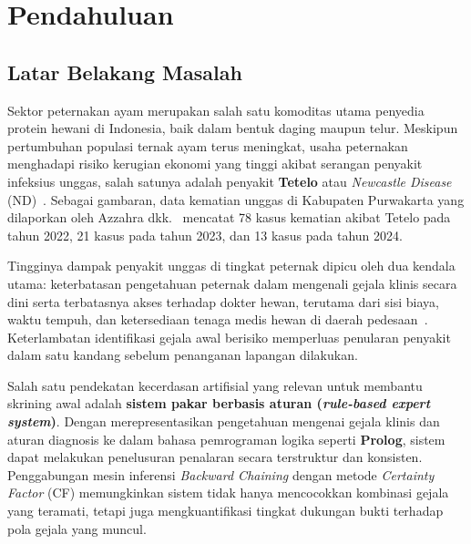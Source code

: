 \documentclass[12pt,a4paper]{report}
\begin{document}

\chapter{Pendahuluan}

\section{Latar Belakang Masalah}
Sektor peternakan ayam merupakan salah satu komoditas utama penyedia protein hewani di Indonesia, baik dalam bentuk daging maupun telur. Meskipun pertumbuhan populasi ternak ayam terus meningkat, usaha peternakan menghadapi risiko kerugian ekonomi yang tinggi akibat serangan penyakit infeksius unggas, salah satunya adalah penyakit \textbf{Tetelo} atau \textit{Newcastle Disease} (ND)~\cite{azzahra2026,ahsyar2021}. Sebagai gambaran, data kematian unggas di Kabupaten Purwakarta yang dilaporkan oleh Azzahra dkk.~\cite{azzahra2026} mencatat 78 kasus kematian akibat Tetelo pada tahun 2022, 21 kasus pada tahun 2023, dan 13 kasus pada tahun 2024.

Tingginya dampak penyakit unggas di tingkat peternak dipicu oleh dua kendala utama: keterbatasan pengetahuan peternak dalam mengenali gejala klinis secara dini serta terbatasnya akses terhadap dokter hewan, terutama dari sisi biaya, waktu tempuh, dan ketersediaan tenaga medis hewan di daerah pedesaan~\cite{ahsyar2021}. Keterlambatan identifikasi gejala awal berisiko memperluas penularan penyakit dalam satu kandang sebelum penanganan lapangan dilakukan.

Salah satu pendekatan kecerdasan artifisial yang relevan untuk membantu skrining awal adalah \textbf{sistem pakar berbasis aturan (\textit{rule-based expert system})}. Dengan merepresentasikan pengetahuan mengenai gejala klinis dan aturan diagnosis ke dalam bahasa pemrograman logika seperti \textbf{Prolog}, sistem dapat melakukan penelusuran penalaran secara terstruktur dan konsisten. Penggabungan mesin inferensi \textit{Backward Chaining} dengan metode \textit{Certainty Factor} (CF) memungkinkan sistem tidak hanya mencocokkan kombinasi gejala yang teramati, tetapi juga mengkuantifikasi tingkat dukungan bukti terhadap pola gejala yang muncul.
\end{document}

